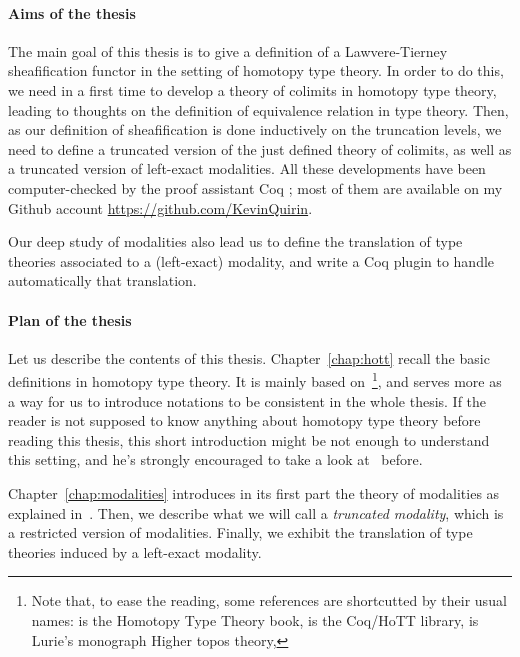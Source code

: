 
\paragraph*{Aims of the thesis}
The main goal of this thesis is to give a definition of a
Lawvere-Tierney sheafification functor in the setting of homotopy type
theory. In order to do this, we need in a first time to develop a
theory of colimits in homotopy type theory, leading to thoughts on the
definition of equivalence relation in type theory. Then, as our
definition of sheafification is done inductively on the truncation
levels, we need to define a truncated version of the just defined
theory of colimits, as well as a truncated version of left-exact
modalities. 
All these developments have been computer-checked by the proof
assistant Coq ; most of them are available on my Github account
\url{https://github.com/KevinQuirin}.

Our deep study of modalities also lead us to 
define the translation of
type theories associated to a (left-exact) modality, and write a Coq
plugin to handle automatically that translation.


\paragraph*{Plan of the thesis}

Let us describe the contents of this thesis. Chapter~\ref{chap:hott}
recall the basic definitions in homotopy type theory. It is mainly
based on~\cite{hottbook}\footnote{Note that, to ease the reading, some
  references are shortcutted by their usual names: \cite{hottbook} is
  the Homotopy Type Theory book, \cite{hottlib} is the Coq/HoTT
  library, \cite{lurie} is Lurie's monograph Higher topos theory,
  \etc}, and serves more as a way for us to introduce notations to be
consistent in the whole thesis. If the reader is not supposed to know
anything about homotopy type theory before reading this thesis, this
short introduction might be not enough to understand this setting, and
he's strongly encouraged to take a look at~\cite{hottbook} before.

Chapter~\ref{chap:modalities} introduces in its first part the theory
of modalities as explained in~\cite{hottbook}. Then, we describe what
we will call a {\em truncated modality}, which is a restricted version
of modalities. Finally, we exhibit the translation of type theories
induced by a left-exact modality.

